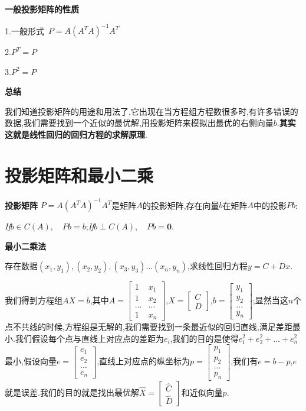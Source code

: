 \documentclass[oneside]{book}
\begin{document}
	\textbf{一般投影矩阵的性质}
	
	1.一般形式\ $P=A(A^{T}A)^{-1}A^{T}$
	
	2.$P^{T}=P$
	
	3.$P^{2}=P$
	
	\textbf{总结}
	
	我们知道投影矩阵的用途和用法了,它出现在当方程组方程数很多时,有许多错误的数据,我们需要找到一个近似的最优解,用投影矩阵来模拟出最优的右侧向量$b$.\textbf{其实这就是线性回归的回归方程的求解原理}.
	\chapter{投影矩阵和最小二乘}
	\textbf{投影矩阵}
	$P=A(A^{T}A)^{-1}A^{T}$是矩阵$A$的投影矩阵,存在向量$b$在矩阵$A$中的投影$Pb$:
	
	\textit{If}\quad $b \in C(A),\quad Pb=b$;\qquad \textit{If}\quad $b \perp C(A),\quad Pb=\textbf{0}$.   
	
	\textbf{最小二乘法}
	
	 存在数据$(x_{1},y_{1}),(x_{2},y_{2}),(x_{3},y_{3})...(x_{n},y_{n})$,求线性回归方程$y=C+Dx$.
	 
	 我们得到方程组$AX=b$,\quad 其中$A=\left[\begin{array}{cc}
	 	1&x_{1}\\1&x_{2}\\...&...\\1&x_{n}
	 \end{array}\right]$,\quad $X=\left[\begin{array}{c}
	 C\\D
 \end{array}\right]$,\quad $b=\left[\begin{array}{c}
 y_{1}\\y_{2}\\...\\y_{n}
\end{array}\right]$;\quad 显然当这$n$个点不共线的时候,方程组是无解的,我们需要找到一条最近似的回归直线,满足差距最小.我们假设每个点与直线上对应点的差距为$e_{i}$,我们的目的是使得$e_{1}^{2}+e_{2}^{2}+...+e_{n}^{2}$最小,假设向量$e=\left[\begin{array}{c}
e_{1}\\e_{2}\\...\\e_{n}
\end{array}\right]$,\quad 直线上对应点的纵坐标为$p=\left[\begin{array}{c}
p_{1}\\p_{2}\\...\\p_{n}
\end{array}\right]$,\quad 我们有$e=b-p$,$e$就是误差.我们的目的就是找出最优解$\hat{X}=\left[\begin{array}{c}
\hat{C}\\\hat{D}
\end{array}\right]$和近似向量$p$.
\end{document}
